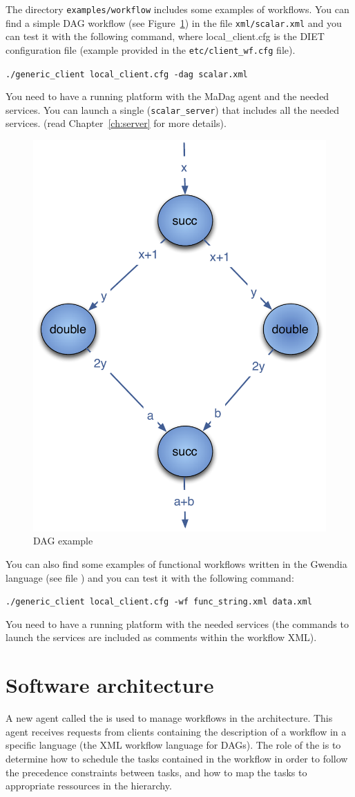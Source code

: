 The directory \texttt{examples/workflow} includes some examples of
workflows.  You can find a simple DAG workflow (see
Figure~\ref{fig:example1}) in the file \texttt{xml/scalar.xml} and you
can test it with the following command, where local_client.cfg is the
DIET configuration file (example provided in the \texttt{etc/client_wf.cfg}
file).

\verb|./generic_client local_client.cfg -dag scalar.xml |

You need to have a running \diet platform with the MaDag agent and
the needed services. You
can launch a single \sed (\texttt{scalar\_server}) that includes all the
needed services. (read Chapter~\ref{ch:server} for more details).

\begin{figure}[htbp]
  \centering
  \includegraphics[keepaspectratio,width=0.4\linewidth]{fig/wf_example1}
  \caption{DAG example}
  \label{fig:example1}
\end{figure}

You can also find some examples of functional workflows written in the
Gwendia language (see file ) and you can
test it with the following command:

\verb|./generic_client local_client.cfg -wf func_string.xml data.xml |

You need to have a running \diet platform with the needed services (the
commands to launch the services are included as comments within the
workflow XML).

\section{Software architecture}

A new agent called the \textit{\madag} is used to manage workflows
in the \diet architecture. This agent receives requests from clients
containing the description of a workflow in a specific language
(the \madag XML workflow language for DAGs). The role of the \madag is to
determine how to schedule the tasks contained in the workflow in
order to follow the precedence constraints between tasks, and how to
map the tasks to appropriate ressources in the \diet hierarchy.

